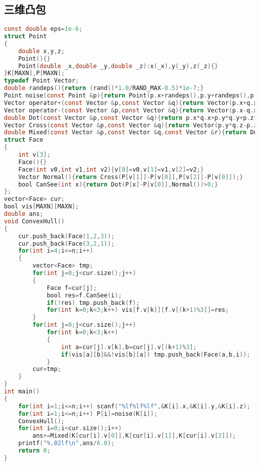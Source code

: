 \subsection{三维凸包}
\begin{lstlisting}[language=C]
const double eps=1e-6;
struct Point
{
	double x,y,z;
	Point(){}
	Point(double _x,double _y,double _z):x(_x),y(_y),z(_z){}
}K[MAXN],P[MAXN];
typedef Point Vector;
double randeps(){return (rand()*1.0/RAND_MAX-0.5)*1e-7;}
Point noise(const Point &p){return Point(p.x+randeps(),p.y+randeps(),p.z+randeps());}
Vector operator+(const Vector &p,const Vector &q){return Vector(p.x+q.x,p.y+q.y,p.z+q.z);}
Vector operator-(const Vector &p,const Vector &q){return Vector(p.x-q.x,p.y-q.y,p.z-q.z);}
double Dot(const Vector &p,const Vector &q){return p.x*q.x+p.y*q.y+p.z*q.z;}
Vector Cross(const Vector &p,const Vector &q){return Vector(p.y*q.z-p.z*q.y,q.x*p.z-p.x*q.z,p.x*q.y-p.y*q.x);}
double Mixed(const Vector &p,const Vector &q,const Vector &r){return Dot(Cross(p,q),r);}
struct Face
{
	int v[3];
	Face(){}
	Face(int v0,int v1,int v2){v[0]=v0,v[1]=v1,v[2]=v2;}
	Vector Normal(){return Cross(P[v[1]]-P[v[0]],P[v[2]]-P[v[0]]);}
	bool CanSee(int x){return Dot(P[x]-P[v[0]],Normal())>0;}
};
vector<Face> cur;
bool vis[MAXN][MAXN];
double ans;
void ConvexHull()
{
	cur.push_back(Face(1,2,3));
	cur.push_back(Face(3,2,1));
	for(int i=4;i<=n;i++)
	{
		vector<Face> tmp;
		for(int j=0;j<cur.size();j++)
		{
			Face f=cur[j];
			bool res=f.CanSee(i);
			if(!res) tmp.push_back(f);
			for(int k=0;k<3;k++) vis[f.v[k]][f.v[(k+1)%3]]=res;
		}
		for(int j=0;j<cur.size();j++)
			for(int k=0;k<3;k++)
			{
				int a=cur[j].v[k],b=cur[j].v[(k+1)%3];
				if(vis[a][b]&&!vis[b][a]) tmp.push_back(Face(a,b,i));
			}
		cur=tmp;
	}
}
int main()
{
	for(int i=1;i<=n;i++) scanf("%lf%lf%lf",&K[i].x,&K[i].y,&K[i].z);
	for(int i=1;i<=n;i++) P[i]=noise(K[i]);
	ConvexHull();
	for(int i=0;i<cur.size();i++)
		ans+=Mixed(K[cur[i].v[0]],K[cur[i].v[1]],K[cur[i].v[2]]);
	printf("%.02lf\n",ans/6.0);
	return 0;
}
\end{lstlisting}